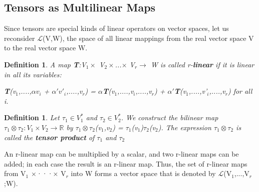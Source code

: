 \documentclass[12pt,a4paper]{article}
\newtheorem{defn}[thm]{Definition}
\begin{document}
\subsection{Tensors as Multilinear Maps}
Since tensors are special kinds of linear operators on vector spaces, let us reconsider $\mathcal{L}$(V,W), the space of all linear mappings from the real vector space V to the real vector space W. 
\begin{defn}
A map \textbf{T}:V$_1\times$ V$_2\times $...$\times$ V$_r\to$ W is called r-\textbf{linear} if it is linear in all its variables:\begin{center}
\textbf{T}(v$_1$,....,$\alpha v_i$ + $\alpha'v'_i$,....,v$_r$) = $\alpha$\textbf{T}(v$_1$,....,v$_i$,....,v$_r$) + $\alpha'$\textbf{T}(v$_1$,....,v'$_i$,....,v$_r$) for all i.
\end{center}
\end{defn}
\begin{defn}
Let $\tau_1\in V^*_1$ and $\tau_2\in V^*_2$. We construct the bilinear map $\tau_1\otimes \tau_2:V_1\times V_2\to \mathbb{R}$ by $\tau_1\otimes \tau_2$(v$_1$,v$_2$) = $\tau_1$(v$_1$)$\tau_2$(v$_2$). The expression $\tau_1\otimes \tau_2$ is called the \textbf{tensor product} of $\tau_1$ and $\tau_2$
\end{defn}
An r-linear map can be multiplied by a scalar, and two r-linear maps can
be added; in each case the result is an r-linear map. Thus, the set of r-linear
maps from V$_1$ $\times$···$\times$ V$_r$ into W forms a vector space that is denoted by
$\mathcal{L}$(V$_1$,...,V$_r$;W).\\
\end{document}
